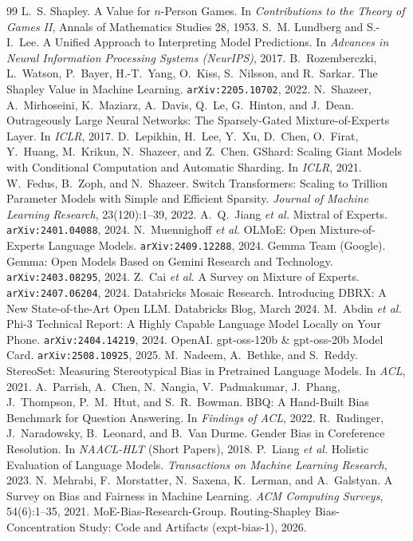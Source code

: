 \documentclass[sigconf]{acmart}
\begin{document}

\begin{thebibliography}{99}
 L.~S. Shapley. A Value for $n$-Person Games. In
  \emph{Contributions to the Theory of Games II}, Annals of Mathematics
  Studies 28, 1953.
 S.~M. Lundberg and S.-I.~Lee. A Unified Approach to
  Interpreting Model Predictions. In \emph{Advances in Neural Information
  Processing Systems (NeurIPS)}, 2017.
 B.~Rozemberczki, L.~Watson, P.~Bayer, H.-T.~Yang,
  O.~Kiss, S.~Nilsson, and R.~Sarkar. The Shapley Value in Machine
  Learning. \texttt{arXiv:2205.10702}, 2022.
 N.~Shazeer, A.~Mirhoseini, K.~Maziarz, A.~Davis,
  Q.~Le, G.~Hinton, and J.~Dean. Outrageously Large Neural Networks: The
  Sparsely-Gated Mixture-of-Experts Layer. In \emph{ICLR}, 2017.
 D.~Lepikhin, H.~Lee, Y.~Xu, D.~Chen, O.~Firat,
  Y.~Huang, M.~Krikun, N.~Shazeer, and Z.~Chen. GShard: Scaling Giant
  Models with Conditional Computation and Automatic Sharding. In
  \emph{ICLR}, 2021.
 W.~Fedus, B.~Zoph, and N.~Shazeer. Switch Transformers:
  Scaling to Trillion Parameter Models with Simple and Efficient Sparsity.
  \emph{Journal of Machine Learning Research}, 23(120):1--39, 2022.
 A.~Q.~Jiang \emph{et al.} Mixtral of Experts.
  \texttt{arXiv:2401.04088}, 2024.
 N.~Muennighoff \emph{et al.} OLMoE: Open
  Mixture-of-Experts Language Models. \texttt{arXiv:2409.12288}, 2024.
 Gemma Team (Google). Gemma: Open Models Based on
  Gemini Research and Technology. \texttt{arXiv:2403.08295}, 2024.
 Z.~Cai \emph{et al.} A Survey on Mixture of Experts.
  \texttt{arXiv:2407.06204}, 2024.
 Databricks Mosaic Research. Introducing DBRX:
  A New State-of-the-Art Open LLM. Databricks Blog, March 2024.
 M.~Abdin \emph{et al.} Phi-3 Technical Report: A
  Highly Capable Language Model Locally on Your Phone.
  \texttt{arXiv:2404.14219}, 2024.
 OpenAI. gpt-oss-120b \& gpt-oss-20b Model Card.
  \texttt{arXiv:2508.10925}, 2025.
 M.~Nadeem, A.~Bethke, and S.~Reddy. StereoSet: Measuring
  Stereotypical Bias in Pretrained Language Models. In \emph{ACL}, 2021.
 A.~Parrish, A.~Chen, N.~Nangia, V.~Padmakumar,
  J.~Phang, J.~Thompson, P.~M.~Htut, and S.~R.~Bowman. BBQ: A
  Hand-Built Bias Benchmark for Question Answering. In \emph{Findings of
  ACL}, 2022.
 R.~Rudinger, J.~Naradowsky, B.~Leonard, and
  B.~Van Durme. Gender Bias in Coreference Resolution. In \emph{NAACL-HLT}
  (Short Papers), 2018.
 P.~Liang \emph{et al.} Holistic Evaluation of Language
  Models. \emph{Transactions on Machine Learning Research}, 2023.
 N.~Mehrabi, F.~Morstatter, N.~Saxena, K.~Lerman, and
  A.~Galstyan. A Survey on Bias and Fairness in Machine Learning. \emph{ACM
  Computing Surveys}, 54(6):1--35, 2021.
 MoE-Bias-Research-Group. Routing-Shapley
  Bias-Concentration Study: Code and Artifacts (expt-bias-1), 2026.
\end{thebibliography}
\end{document}
